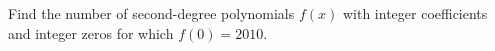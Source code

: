 Find the number of second-degree polynomials $ f(x)$ with integer coefficients and integer zeros for which $ f(0)=2010$.

